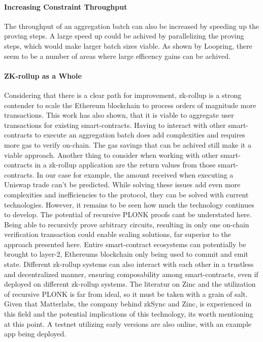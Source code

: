 \documentclass[../../thesis.tex]{subfiles}
\begin{document}
\paragraph{Increasing Constraint Throughput}
The throughput of an aggregation batch can also be increased by speeding up the proving steps. A large speed up could be achived by parallelizing the proving steps, which would make larger batch sizes viable. As shown by Loopring, there seem to be a number of areas where large efficency gains can be achived. 

\paragraph{ZK-rollup as a Whole}
Considering that there is a clear path for improvement, zk-rollup is a strong contender to scale the Ethereum blockchain to process orders of magnitude more transactions. This work has also shown, that it is viable to aggregate user transactions for existing smart-contracts. Having to interact with other smart-contracts to execute an aggregation batch does add complexities and requires more gas to verify on-chain. The gas savings that can be achived still make it a viable approach. Another thing to consider when working with other smart-contracts in a zk-rollup application are the return values from those smart-contracts. In our case for example, the amount received when executing a Uniswap trade can't be predicted. While solving these issues add even more complexities and inefficiencies to the protocol, they can be solved with current technologies. However, it remains to be seen how much the technology continues to develop. The potential of recursive PLONK proofs cant be understated here. Being able to recursivly prove arbitrary circuits, resulting in only one on-chain verification transaction could enable scaling solutions, far superior to the approach presented here. Entire smart-contract ecosystems can potentially be brought to layer-2, Ethereums blockchain only being used to commit and emit state. Different zk-rollup systems can also interact with each other in a trustless and decentralized manner, ensuring composability among smart-contracts, even if deployed on different zk-rollup systems. The literatur on Zinc and the utilization of recursive PLONK is far from ideal, so it must be taken with a grain of salt. Given that Matterlabs, the company behind zkSync and Zinc, is experienced in this field and the potential implications of this technology, its worth mentioning at this point. A testnet utilizing early versions are also online, with an example app being deployed.
\end{document}
